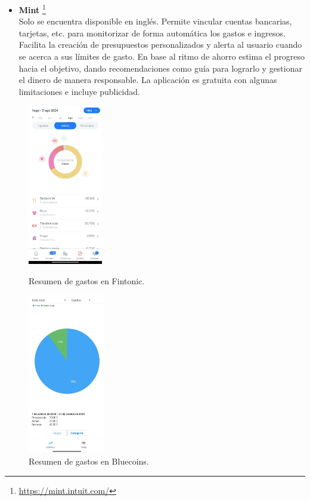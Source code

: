 \begin{itemize}
    \item \textbf{Mint} \footnote{\url{https://mint.intuit.com/}} \\
    Solo se encuentra disponible en inglés. Permite vincular cuentas bancarias, tarjetas, etc. para monitorizar de forma 
    automática los gastos e ingresos. Facilita la creación de presupuestos personalizados y 
    alerta al usuario cuando se acerca a sus límites de gasto.
    En base al ritmo de ahorro estima el progreso hacia el objetivo, dando recomendaciones 
    como guía para lograrlo y gestionar el dinero de manera responsable. 
    La aplicación es gratuita con algunas limitaciones e incluye publicidad.
\end{itemize}

\begin{figure}[ht!]
    \centering
    \begin{minipage}{0.45\textwidth}
        \centering
        \includegraphics[height = 70mm]{imagenes/resumen-gastos-mes-fintonic.jpg}
        \caption{Resumen de gastos en Fintonic.}
        \label{fig:resumen_gastos_mes_fintonic}
    \end{minipage}\hfill
    \begin{minipage}{0.45\textwidth}
        \centering
        \includegraphics[height = 70mm]{imagenes/resumen-gastos-bluecoins.jpg}
        \caption{Resumen de gastos en Bluecoins.}
        \label{fig:resumen_gastos_bluecoins}
    \end{minipage}
\end{figure}

